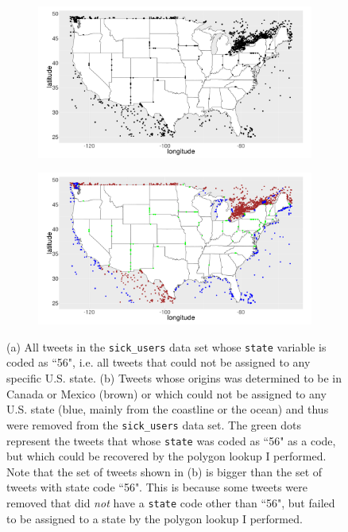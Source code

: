 \documentclass[11pt, a4paper,twoside]{report}\usepackage[]{graphicx}\usepackage[]{color}
\begin{document}
\begin{figure}[H]
  \centering
    \begin{subfigure}[t]{0.9\textwidth}
    \includegraphics[width=1\linewidth]{04_state56_sick_raw_df.png}
    \caption{}
  \end{subfigure}
  \begin{subfigure}[t]{0.9\textwidth}
  \includegraphics[width=1\linewidth]{05_CanexicoAndRemoved_sick_raw_df.png}
  \caption{}
  \end{subfigure}
  \caption{(a) All tweets in the \texttt{sick\_users} data set whose \texttt{state} variable is coded as ``56", i.e. all tweets that could not be assigned to any specific U.S. state. (b) Tweets whose origins was determined to be in Canada or Mexico (brown) or which could not be assigned to any U.S. state (blue, mainly from the coastline or the ocean) and thus were removed from the \texttt{sick\_users} data set. The green dots represent the tweets that whose \texttt{state} was coded as ``56" as  a code, but which could be recovered by the polygon lookup I performed. Note that the set of tweets shown in (b) is bigger than the set of tweets with state code ``56". This is because some tweets were removed that did \textit{not} have a \texttt{state} code other than ``56", but failed to be assigned to a state by the polygon lookup I performed.}
  \label{fig:canexico_and_removed}
  \end{figure}
\end{document}
